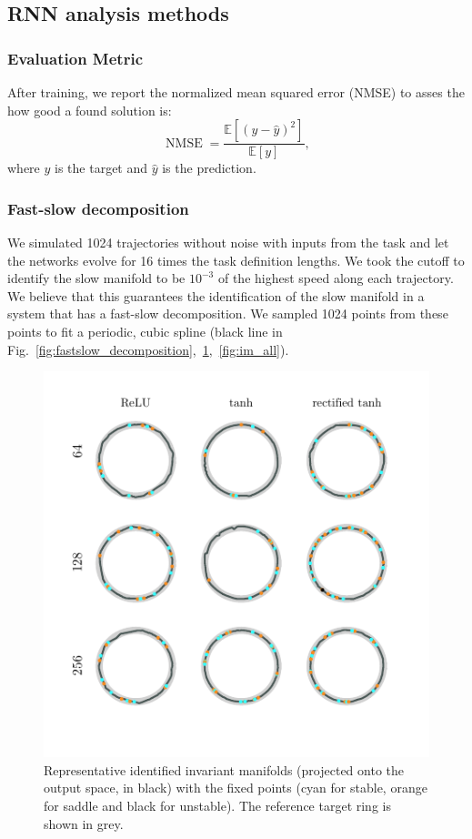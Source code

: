 \documentclass{article} %
\newcounter{ct}
\theoremstyle{definition}
\theoremstyle{remark}
\begin{document}
\newpage
 \subsection{RNN analysis methods}


\subsubsection{Evaluation Metric}
After training, we report the normalized mean squared error (NMSE) to asses the how good a found solution is:
\begin{equation}
\operatorname{NMSE} = \frac{\mathbb{E}[(y-\hat y)^2]}{\mathbb{E}[y]},
\end{equation}
where \(y\) is the target and \(\hat y\) is the prediction.


 \subsubsection{Fast-slow decomposition}\label{sec:fsdecmethod}
 We simulated 1024 trajectories without noise with inputs from the task and let the networks evolve for 16 times the task definition lengths.
 We took the cutoff to identify the slow manifold to be \(10^{-3}\) of the highest speed along each trajectory.
 We believe that this guarantees the identification of the slow manifold in a system that has a fast-slow decomposition.
 We sampled 1024 points from these points to fit a periodic, cubic spline (black line in Fig.~\ref{fig:fastslow_decomposition},~\ref{fig:im_rep},~\ref{fig:im_all}).

   \begin{figure}[tbhp]
     \centering
    \includegraphics[width=\textwidth]{im_all_last2}
       \caption{Representative identified invariant manifolds (projected onto the output space, in black) with the fixed points (cyan for stable, orange for saddle and black for unstable). The reference target ring is shown in grey.}\label{fig:im_rep}
\end{figure}
\end{document}
